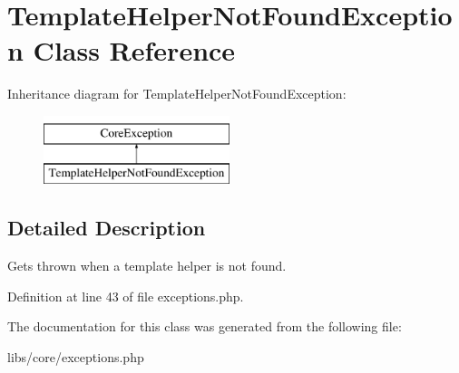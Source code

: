 \hypertarget{class_template_helper_not_found_exception}{\section{\-Template\-Helper\-Not\-Found\-Exception \-Class \-Reference}
\label{class_template_helper_not_found_exception}
}
\-Inheritance diagram for \-Template\-Helper\-Not\-Found\-Exception\-:\begin{figure}[H]
\begin{center}
\leavevmode
\includegraphics[height=2.000000cm]{class_template_helper_not_found_exception}
\end{center}
\end{figure}


\subsection{\-Detailed \-Description}
\-Gets thrown when a template helper is not found. 

\-Definition at line 43 of file exceptions.\-php.



\-The documentation for this class was generated from the following file\-:\begin{DoxyCompactItemize}
\item 
libs/core/exceptions.\-php\end{DoxyCompactItemize}
